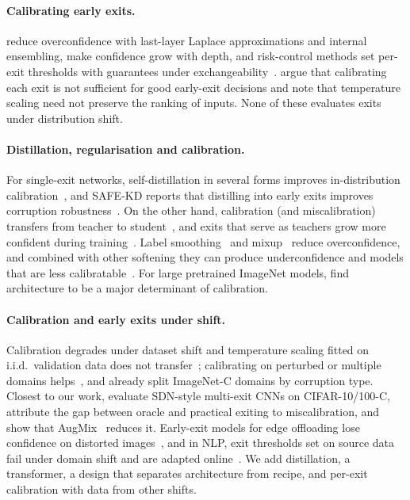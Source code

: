 \documentclass[10pt]{article}
\begin{document}
\paragraph{Calibrating early exits.} \citet{meronen2024fixing} reduce overconfidence with last-layer Laplace
approximations and internal ensembling, \citet{jazbec2023anytime} make confidence grow with depth, and risk-control
methods set per-exit thresholds with guarantees under exchangeability~\citep{jazbec2024fast,khazem2026safekd}.
\citet{kubaty2025rethinking} argue that calibrating each exit is not sufficient for good early-exit decisions and
note that temperature scaling need not preserve the ranking of inputs. None of these evaluates exits under
distribution shift.
\paragraph{Distillation, regularisation and calibration.} For single-exit networks, self-distillation in several
forms improves in-distribution calibration~\citep{zhang2020selfdistillation,yun2020cskd,kim2021pskd}, and SAFE-KD
reports that distilling into early exits improves corruption robustness~\citep{khazem2026safekd}. On the other hand,
calibration (and miscalibration) transfers from teacher to student~\citep{hebbalaguppe2024calibrationtransfer}, and
exits that serve as teachers grow more confident during training~\citep{phuong2019distillation}. Label
smoothing~\citep{muller2019labelsmoothing} and mixup~\citep{thulasidasan2019mixup} reduce overconfidence, and combined
with other softening they can produce underconfidence and models that are less
calibratable~\citep{wen2021combining,wang2021rethinking,wang2023pitfall}. For large pretrained ImageNet models,
\citet{minderer2021revisiting} find architecture to be a major determinant of calibration.
\paragraph{Calibration and early exits under shift.} Calibration degrades under dataset shift and temperature scaling
fitted on i.i.d.\ validation data does not transfer~\citep{ovadia2019trust}; calibrating on perturbed or multiple
domains helps~\citep{tomani2021posthoc,gong2021confidence,yu2022multidomain}, and \citet{yu2022multidomain} already
split ImageNet-C domains by corruption type. Closest to our work, \citet{mehra2022robustness} evaluate SDN-style
multi-exit CNNs on CIFAR-10/100-C, attribute the gap between oracle and practical exiting to miscalibration, and show
that AugMix~\citep{hendrycks2020augmix} reduces it. Early-exit models for edge offloading lose confidence on distorted
images~\citep{pacheco2021distorted}, and in NLP, exit thresholds set on source data fail under domain shift and are
adapted online~\citep{bajpai2024ceebert,bajpai2025beyond}. We add distillation, a transformer, a design that
separates architecture from recipe, and per-exit calibration with data from other shifts.
\end{document}
